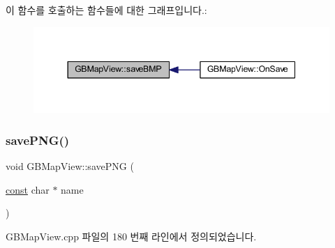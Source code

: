 이 함수를 호출하는 함수들에 대한 그래프입니다.\+:
\nopagebreak
\begin{figure}[H]
\begin{center}
\leavevmode
\includegraphics[width=344pt]{class_g_b_map_view_a90fcc5d761fb5dfdb8f61e405831f3b5_icgraph}
\end{center}
\end{figure}
\mbox{\label{class_g_b_map_view_a18226efdae32cdcf93b2994d2c002a02}} 
\subsubsection{\texorpdfstring{save\+P\+N\+G()}{savePNG()}}
{\footnotesize\ttfamily void G\+B\+Map\+View\+::save\+P\+NG (\begin{DoxyParamCaption}\item[{\mbox{\hyperlink{getopt1_8c_a2c212835823e3c54a8ab6d95c652660e}{const}} char $\ast$}]{name }\end{DoxyParamCaption})}



G\+B\+Map\+View.\+cpp 파일의 180 번째 라인에서 정의되었습니다.


